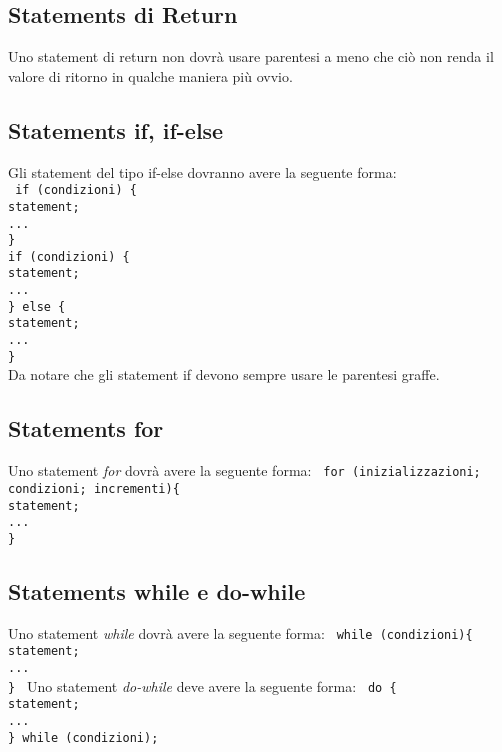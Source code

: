 \subsection{Statements di Return}
Uno statement di return non dovr\`a usare parentesi a meno che ci\`o non renda il valore di ritorno in qualche maniera pi\`u ovvio.
\subsection{Statements if, if-else}
Gli statement del tipo if-else dovranno avere la seguente forma:\\
\texttt{
	 \newline
	if (condizioni) \{ \\
	\phantom{....}statement;\\
	\phantom{....}... \\
	\}
	\\
	\newline
	\newline
	if (condizioni) \{ \\
	\phantom{....}statement;\\
	\phantom{....}... \\
	\} else \{\\
	\phantom{....}statement;\\
	\phantom{....}... \\
	\}
	\\
	\newline
}
Da notare che gli statement if devono sempre usare le parentesi graffe.
\subsection{Statements for}
Uno statement \textit{for} dovr\`a avere la seguente forma: \newline
\texttt{
	 \newline
	for (inizializzazioni; condizioni; incrementi)\{ \\
	\phantom{....}statement;\\
	\phantom{....}... \\
	\}
}
\subsection{Statements while e do-while}
Uno statement \textit{while} dovr\`a avere la seguente forma:\newline
\texttt{
	 \newline
	while (condizioni)\{ \\
	\phantom{....}statement;\\
	\phantom{....}... \\
	\}
}\newline
 \newline
Uno statement \textit{do-while} deve avere la seguente forma: \newline
\texttt{
	 \newline
	do \{ \\
	\phantom{....}statement;\\
	\phantom{....}... \\
	\} while (condizioni);
}
